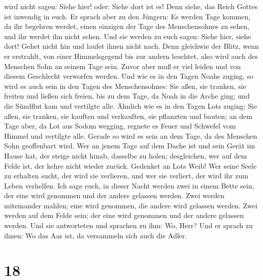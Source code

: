 wird nicht sagen: Siehe hier! oder: Siehe dort ist es! Denn siehe, das
Reich Gottes ist inwendig in euch.  Er sprach aber zu den
Jüngern: Es werden Tage kommen, da ihr begehren werdet, einen einzigen
der Tage des Menschensohnes zu sehen, und ihr werdet ihn nicht sehen.
 Und sie werden zu euch sagen: Siehe hier, siehe dort!
Gehet nicht hin und laufet ihnen nicht nach.  Denn
gleichwie der Blitz, wenn er erstrahlt, von einer Himmelsgegend bis zur
andern leuchtet, also wird auch des Menschen Sohn an seinem Tage sein.
 Zuvor aber muß er viel leiden und von diesem Geschlecht
verworfen werden.  Und wie es in den Tagen Noahs zuging,
so wird es auch sein in den Tagen des Menschensohnes: 
Sie aßen, sie tranken, sie freiten und ließen sich freien, bis zu dem
Tage, da Noah in die Arche ging; und die Sündflut kam und vertilgte
alle.  Ähnlich wie es in den Tagen Lots zuging: Sie aßen,
sie tranken, sie kauften und verkauften, sie pflanzten und bauten;
 an dem Tage aber, da Lot aus Sodom wegging, regnete es
Feuer und Schwefel vom Himmel und vertilgte alle.  Gerade
so wird es sein an dem Tage, da des Menschen Sohn geoffenbart wird.
 Wer an jenem Tage auf dem Dache ist und sein Gerät im
Hause hat, der steige nicht hinab, dasselbe zu holen; desgleichen, wer
auf dem Felde ist, der kehre nicht wieder zurück. 
Gedenket an Lots Weib!  Wer seine Seele zu erhalten
sucht, der wird sie verlieren, und wer sie verliert, der wird ihr zum
Leben verhelfen.  Ich sage euch, in dieser Nacht werden
zwei in einem Bette sein, der eine wird genommen und der andere gelassen
werden.  Zwei werden miteinander mahlen; eine wird
genommen, die andere wird gelassen werden.  Zwei werden
auf dem Felde sein; der eine wird genommen und der andere gelassen
werden.  Und sie antworteten und sprachen zu ihm: Wo,
Herr? Und er sprach zu ihnen: Wo das Aas ist, da versammeln sich auch
die Adler.

\hypertarget{section-17}{%
\section{18}\label{section-17}}

